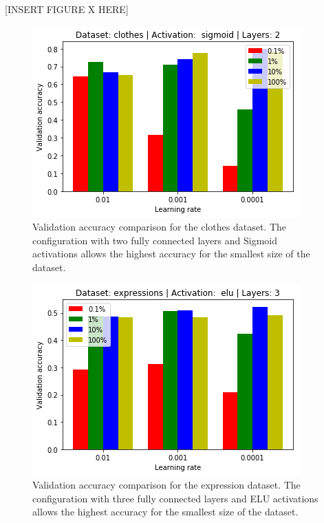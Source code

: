 \documentclass{article}
\begin{document}
[INSERT FIGURE X HERE]

\begin{figure}[tb]
    \vskip 5mm
        \begin{center}
            \includegraphics[scale=0.5]{accuracy_reduction_00.png}
            \caption{Validation accuracy comparison for the clothes dataset. The configuration with two fully connected layers and Sigmoid activations allows the highest accuracy for the smallest size of the dataset.}
            \label{fig:tf_clot}
        \end{center}
    \vskip -5mm
\end{figure}

\begin{figure}[tb]
    \vskip 5mm
        \begin{center}
            \includegraphics[scale=0.5]{accuracy_reduction_01.png}
            \caption{Validation accuracy comparison for the expression dataset. The configuration with three fully connected layers and ELU activations allows the highest accuracy for the smallest size of the dataset.}
            \label{fig:tf_exp}
        \end{center}
    \vskip -5mm
\end{figure}
\end{document}
